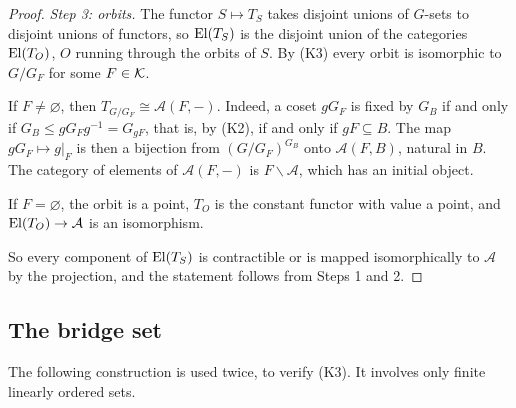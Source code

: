 \begin{proof}
\emph{Step 3: orbits.} The functor $S\mapsto T_S$ takes disjoint unions of
$G$-sets to disjoint unions of functors, so $\operatorname{El}(T_S)$ is the disjoint union of
the categories $\operatorname{El}(T_O)$, $O$ running through the orbits of $S$. By (K3)
every orbit is isomorphic to $G/G_F$ for some $F\in\mathcal{K}$.

If $F\ne\varnothing$, then $T_{G/G_F}\cong\mathcal A(F,-)$. Indeed, a coset
$gG_F$ is fixed by $G_B$ if and only if $G_B\le gG_Fg^{-1}=G_{gF}$, that is, by
(K2), if and only if $gF\subseteq B$. The map $gG_F\mapsto g|_F$ is then a
bijection from $(G/G_F)^{G_B}$ onto $\mathcal A(F,B)$, natural in $B$. The
category of elements of $\mathcal A(F,-)$ is $F\backslash\mathcal A$, which has
an initial object.

If $F=\varnothing$, the orbit is a point, $T_O$ is the constant functor with
value a point, and $\operatorname{El}(T_O)\to\mathcal A$ is an isomorphism.

So every component of $\operatorname{El}(T_S)$ is contractible or is mapped isomorphically
to $\mathcal A$ by the projection, and the statement follows from Steps 1
and 2.
\end{proof}

\subsection{The bridge set}

The following construction is used twice, to verify \textup{(K3)}. It involves
only finite linearly ordered sets.

